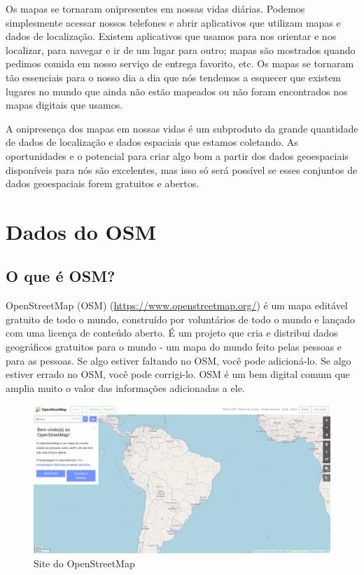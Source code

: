 \documentclass[
]{krantz}
\begin{document}
Os mapas se tornaram onipresentes em nossas vidas diárias. Podemos simplesmente acessar nossos telefones e abrir aplicativos que utilizam mapas e dados de localização. Existem aplicativos que usamos para nos orientar e nos localizar, para navegar e ir de um lugar para outro; mapas são mostrados quando pedimos comida em nosso serviço de entrega favorito, etc. Os mapas se tornaram tão essenciais para o nosso dia a dia que nós tendemos a esquecer que existem lugares no mundo que ainda não estão mapeados ou não foram encontrados nos mapas digitais que usamos.

A onipresença dos mapas em nossas vidas é um subproduto da grande quantidade de dados de localização e dados espaciais que estamos coletando. As oportunidades e o potencial para criar algo bom a partir dos dados geoespaciais disponíveis para nós são excelentes, mas isso só será possível se esses conjuntos de dados geoespaciais forem gratuitos e abertos.

\hypertarget{dados-do-osm}{%
\section{Dados do OSM}\label{dados-do-osm}}

\hypertarget{o-que-uxe9-osm}{%
\subsection{O que é OSM?}\label{o-que-uxe9-osm}}

OpenStreetMap (OSM) (\url{https://www.openstreetmap.org/}) é um mapa editável gratuito de todo o mundo, construído por voluntários de todo o mundo e lançado com uma licença de conteúdo aberto. É um projeto que cria e distribui dados geográficos gratuitos para o mundo - um mapa do mundo feito pelas pessoas e para as pessoas. Se algo estiver faltando no OSM, você pode adicioná-lo. Se algo estiver errado no OSM, você pode corrigi-lo. OSM é um bem digital comum que amplia muito o valor das informações adicionadas a ele.

\begin{figure}
\centering
\includegraphics{media/modulo3/osm.png}
\caption{Site do OpenStreetMap}
\end{figure}
\end{document}
